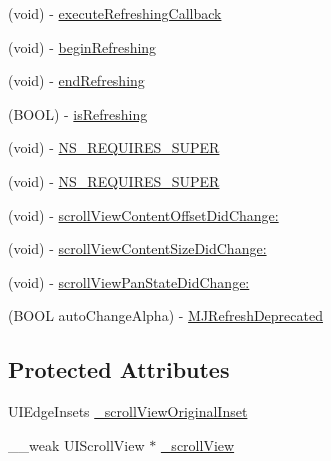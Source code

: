 \begin{DoxyCompactItemize}
(void) -\/ \mbox{\hyperlink{interface_m_j_refresh_component_a618a54cc5f6bad921ebcbfdc637fb892}{execute\+Refreshing\+Callback}}
\item 
(void) -\/ \mbox{\hyperlink{interface_m_j_refresh_component_a0f34a467638a93530b64ae1237785b0a}{begin\+Refreshing}}
\item 
(void) -\/ \mbox{\hyperlink{interface_m_j_refresh_component_a609c032e2e29754a553b78b544b40223}{end\+Refreshing}}
\item 
(B\+O\+OL) -\/ \mbox{\hyperlink{interface_m_j_refresh_component_abe507257c3d1ff768ff51ce37265fba3}{is\+Refreshing}}
\item 
(void) -\/ \mbox{\hyperlink{interface_m_j_refresh_component_a3c89effddae59a40b856391db8985aba}{N\+S\+\_\+\+R\+E\+Q\+U\+I\+R\+E\+S\+\_\+\+S\+U\+P\+ER}}
\item 
(void) -\/ \mbox{\hyperlink{interface_m_j_refresh_component_a3c89effddae59a40b856391db8985aba}{N\+S\+\_\+\+R\+E\+Q\+U\+I\+R\+E\+S\+\_\+\+S\+U\+P\+ER}}
\item 
(void) -\/ \mbox{\hyperlink{interface_m_j_refresh_component_a9ca510683802fd76db4ab79ad31cd6b9}{scroll\+View\+Content\+Offset\+Did\+Change\+:}}
\item 
(void) -\/ \mbox{\hyperlink{interface_m_j_refresh_component_af32e7cdaf4d1503b551e77baa8266aa5}{scroll\+View\+Content\+Size\+Did\+Change\+:}}
\item 
(void) -\/ \mbox{\hyperlink{interface_m_j_refresh_component_a16e5ed763451362a1bc76caa4ed761b1}{scroll\+View\+Pan\+State\+Did\+Change\+:}}
\item 
(B\+O\+OL auto\+Change\+Alpha) -\/ \mbox{\hyperlink{interface_m_j_refresh_component_afa4faed890bbcd4a6926c69c6d443196}{M\+J\+Refresh\+Deprecated}}
\end{DoxyCompactItemize}
\subsection*{Protected Attributes}
\begin{DoxyCompactItemize}
\item 
U\+I\+Edge\+Insets \mbox{\hyperlink{interface_m_j_refresh_component_a17488427376814e94276cdcb90db566d}{\+\_\+scroll\+View\+Original\+Inset}}
\item 
\+\_\+\+\_\+weak U\+I\+Scroll\+View $\ast$ \mbox{\hyperlink{interface_m_j_refresh_component_ae05ececfb872f30d59b28aa4a81bf948}{\+\_\+scroll\+View}}
\end{DoxyCompactItemize}
